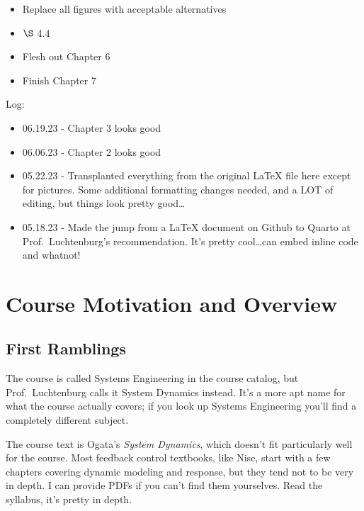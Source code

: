 \documentclass[
  letterpaper,
  DIV=11,
  numbers=noendperiod]{scrreprt}
\providecommand{\tightlist}{%
  \setlength{\itemsep}{0pt}\setlength{\parskip}{0pt}}\usepackage{longtable,booktabs,array}
\begin{document}
\begin{itemize}
\tightlist
\item
  Replace all figures with acceptable alternatives
\item
  \(\S\) 4.4
\item
  Flesh out Chapter 6
\item
  Finish Chapter 7
\end{itemize}

Log:

\begin{itemize}
\item
  06.19.23 - Chapter 3 looks good
\item
  06.06.23 - Chapter 2 looks good
\item
  05.22.23 - Transplanted everything from the original LaTeX file here
  except for pictures. Some additional formatting changes needed, and a
  LOT of editing, but things look pretty good\ldots{}
\item
  05.18.23 - Made the jump from a LaTeX document on Github to Quarto at
  Prof.~Luchtenburg's recommendation. It's pretty cool\ldots can embed
  inline code and whatnot!
\end{itemize}


\hypertarget{course-motivation-and-overview}{%
\chapter{Course Motivation and
Overview}\label{course-motivation-and-overview}}

\hypertarget{first-ramblings}{%
\section{First Ramblings}\label{first-ramblings}}

The course is called Systems Engineering in the course catalog, but
Prof.~Luchtenburg calls it System Dynamics instead. It's a more apt name
for what the course actually covers; if you look up Systems Engineering
you'll find a completely different subject.

The course text is Ogata's \emph{System Dynamics}, which doesn't fit
particularly well for the course. Most feedback control textbooks, like
Nise, start with a few chapters covering dynamic modeling and response,
but they tend not to be very in depth. I can provide PDFs if you can't
find them yourselves. Read the syllabus, it's pretty in depth.
\end{document}
